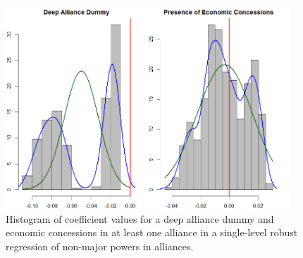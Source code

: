 \documentclass[12pt]{article}
\begin{document}
\begin{figure}[htbp]
	\centering
		\includegraphics[width=0.95\textwidth]{eba-single-level.png}
	\caption{Histogram of coefficient values for a deep alliance dummy and economic concessions in at least one alliance in a single-level robust regression of non-major powers in alliances.}
	\label{fig:eba-single-level}
\end{figure}



  
 
\end{document}
